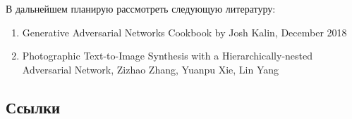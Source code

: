\documentclass{article}
\begin{document}
    В дальнейшем планирую рассмотреть следующую литературу:
    \begin{enumerate} 
\item Generative Adversarial Networks Cookbook by Josh Kalin, December 2018
\item Photographic Text-to-Image Synthesis with a Hierarchically-nested Adversarial Network, Zizhao Zhang, Yuanpu Xie, Lin Yang\\
    \end{enumerate} 
\newpage
    \begin{center} 
    \section{Ссылки}
    \end{center} 
      \large 
\end{document}
